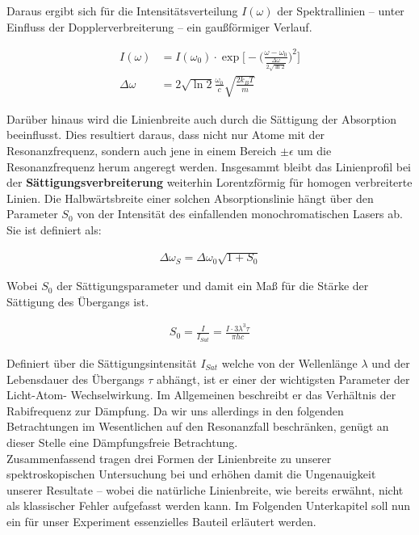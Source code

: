 \noindent Daraus ergibt sich für die Intensitätsverteilung $I(\omega)$ der Spektrallinien -- unter Einfluss der Dopplerverbreiterung -- ein gaußförmiger Verlauf. \cite{H2}

\begin{align}
    I(\omega) &= I(\omega_{0}) \cdot \exp \biggl[- \biggl(\frac{\omega-\omega_{0}}{\frac{\Delta \omega}{2\sqrt{\ln{2}}}}\biggr)^2 \biggr] \label{eq:gauss-intensity} \\
    \Delta \omega &= 2\sqrt{\ln 2} \frac{\omega_{0}}{c}\sqrt{\frac{2k_{B}T}{m}} \label{eq:delta-omega}
\end{align}

\noindent Darüber hinaus wird die Linienbreite auch durch die Sättigung der Absorption beeinflusst. Dies resultiert daraus, dass nicht nur Atome mit der Resonanzfrequenz, sondern auch jene in einem Bereich $\pm \epsilon$ um die Resonanzfrequenz herum angeregt werden. Insgesammt bleibt das Linienprofil bei der \textbf{Sättigungsverbreiterung} weiterhin Lorentzförmig für homogen verbreiterte Linien. Die Halbwärtsbreite einer solchen Absorptionslinie hängt über den Parameter $S_{0}$ von der Intensität des einfallenden monochromatischen Lasers ab. Sie ist definiert als:

\begin{align}
    \Delta\omega_{S}=\Delta\omega_{0}\sqrt{1+S_{0}}
    \label{eq:Sätt}
\end{align}

\noindent Wobei $S_{0}$ der Sättigungsparameter und damit ein Maß für die Stärke der Sättigung des Übergangs ist.

\begin{align}
    S_{0}= \frac{I}{I_{Sat}}= \frac{I \cdot 3\lambda^{3}\tau}{\pi h c}
\end{align}

\noindent Definiert über die Sättigungsintensität $I_{Sat}$ welche von der Wellenlänge $\lambda$ und der Lebensdauer des Übergangs $\tau$ abhängt, ist er einer der wichtigsten Parameter der Licht-Atom- Wechselwirkung. Im Allgemeinen beschreibt er das Verhältnis der Rabifrequenz zur Dämpfung. Da wir uns allerdings in den folgenden Betrachtungen im Wesentlichen auf den Resonanzfall beschränken, genügt an dieser Stelle eine Dämpfungsfreie Betrachtung. \\

\noindent Zusammenfassend tragen drei Formen der Linienbreite zu unserer spektroskopischen Untersuchung bei und erhöhen damit die Ungenauigkeit unserer Resultate -- wobei die natürliche Linienbreite, wie bereits erwähnt, nicht als klassischer Fehler aufgefasst werden kann.
\noindent Im Folgenden Unterkapitel soll nun ein für unser Experiment essenzielles Bauteil erläutert werden.

